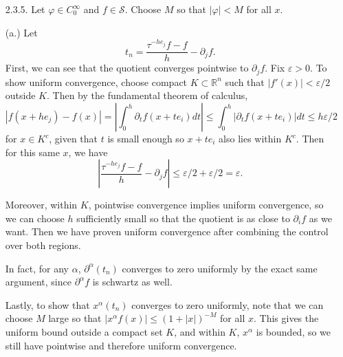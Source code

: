 \documentclass[11pt, reqno]{article}
\theoremstyle{plain}
\theoremstyle{definition}
\theoremstyle{remark}
\renewcommand{\phi}{\varphi}
\renewcommand{\epsilon}{\varepsilon}
\newcommand{\RR}{\mathbb{R}}
\begin{document}
\begin{enumerate}
    (d.) We need to compute
    \[
        \langle \partial \log|x|, \phi\rangle = -\langle \log|x|,\partial_x \phi\rangle
    \]
    for any $\phi \in \mathscr{S}(\RR)$. Let $\epsilon > 0$. Then
    \[
        \int_{\epsilon \leq |x|} \phi(x) \frac{1}{x}dx = -\int_{\epsilon \leq |x|}\partial_x\phi(x) \log|x|dx
    \]
    after integrating by parts, noting that the first integrand is integrable for any $\epsilon > 0$. 
    Moreover, the function $\log|x|$ is integrable on $\RR$, so we can let epsilon go to zero in the final integral.
    So the limit converges for all $\phi$:
    \[
        u(\phi) = \lim_{\epsilon \to 0} \int_{\epsilon \leq |x|} \phi(x)\frac{1}{x}dx = -\int_\RR \partial \phi(x) \log|x|dx = \langle \log|x|, \partial_x \phi\rangle =: \langle \partial_x \log|x|, \phi\rangle.
    \]

    We have proven the sequence of tempered distributions defining $u$ converges to $\partial_x \log |x|$ in the weak$^*$ topology on $\mathscr{S}'(\RR)$, 
    and so this is the derivative.

    \item[2.3.5.] Let $\phi \in C_0^\infty$ and $f \in \mathscr{S}$. Choose $M$ so that $|\phi| < M$ for all $x$. 
    
    (a.) Let 
    \[
        t_n = \frac{\tau^{-he_j}f - f}{h} - \partial_j f.
    \]
        First, we can see that the quotient converges pointwise to
    $\partial_j f$. Fix $\epsilon > 0$. To show uniform convergence, choose compact $K \subset \RR^n$ 
    such that $|f'(x)| < \epsilon/2$ outside $K$. Then by the fundamental theorem of calculus,
    \[
        |f(x + h e_j) - f(x)| = \left| \int_0^h \partial_t f(x + te_i)dt\right| \leq \int_0^h|\partial_t f(x + t e_i)|dt
        \leq h\epsilon/2
    \]
    for $x \in K^c$, given that $t$ is small enough so $x + te_i$ also lies within $K^c$. Then for this same $x$, we have
    \[
        \left|\frac{\tau^{-he_j}f - f}{h} - \partial_j f\right| \leq \epsilon/2 + \epsilon/2 = \epsilon.
    \]

    Moreover, within $K$, pointwise convergence implies uniform convergence, so we can choose $h$ sufficiently small so that
    the quotient is as close to $\partial_i f$ as we want. Then we have proven uniform convergence after combining the control over both regions.

    In fact, for any $\alpha$, $\partial^\alpha(t_n)$ converges to zero uniformly by the exact same argument, since $\partial^\alpha f$ is schwartz as well. 
    
    Lastly, to show that $x^\alpha(t_n)$ converges to zero uniformly, note that we can choose $M$ large so that $|x^\alpha f(x)| \leq (1 + |x|)^{-M}$
    for all $x$. This gives the uniform bound outside a compact set $K$, and within $K$, $x^\alpha$ is bounded,
    so we still have pointwise and therefore uniform convergence.


\end{enumerate}
\end{document}
